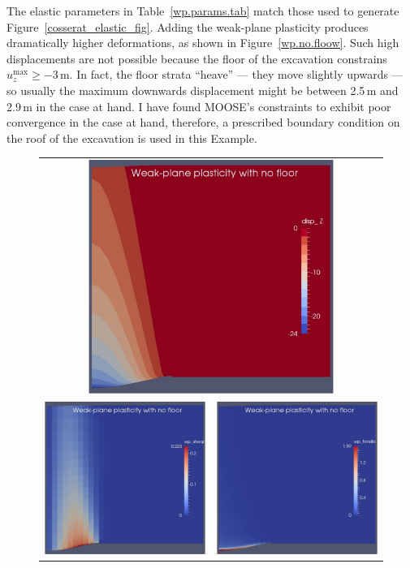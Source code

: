\documentclass[]{scrreprt}
\begin{document}
The elastic parameters in Table~\ref{wp.params.tab} match those used
to generate Figure~\ref{cosserat_elastic_fig}.  Adding the weak-plane
plasticity produces dramatically higher deformations, as shown in
Figure~\ref{wp.no.floow}.  Such high displacements are not possible
because the floor of the excavation constrains
$u_{z}^{\mathrm{max}}\geq -3$\,m.  In fact, the floor strata ``heave''
--- they move slightly upwards --- so usually the maximum downwards
displacement might be between 2.5\,m and 2.9\,m in the case at hand.
I have found MOOSE's constraints to exhibit poor convergence in the
case at hand, therefore, a prescribed boundary condition on the roof
of the excavation is used in this Example.

\begin{figure}[p]
\begin{center}
\begin{tabular}{cc}
\multicolumn{2}{c}{\includegraphics[width=8cm]{wp_only_no_floor_disp.pdf}}
  \\
\includegraphics[width=6cm]{wp_only_no_floor_shear.pdf} &
\includegraphics[width=6cm]{wp_only_no_floor_tensile.pdf} \\

\end{tabular}
\end{center}
\end{figure}
\end{document}
